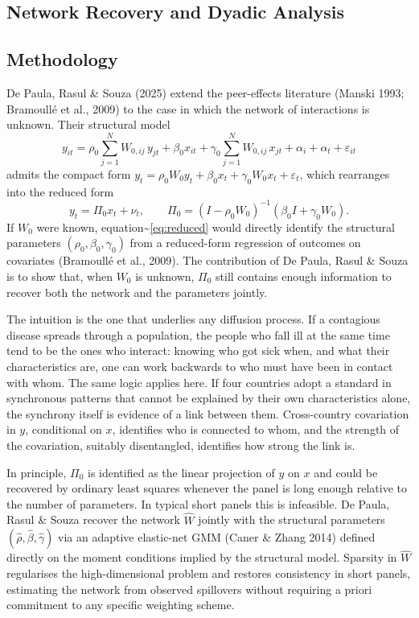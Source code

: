\documentclass[
  letterpaper,
  DIV=11,
  numbers=noendperiod]{scrartcl}
\begin{document}
\subsection{Network Recovery and Dyadic
Analysis}\label{network-recovery-and-dyadic-analysis}

\subsection*{Methodology}

De Paula, Rasul \& Souza (2025) extend the peer-effects literature
(Manski 1993; Bramoullé et al., 2009) to the case in which the network
of interactions is unknown. Their structural model \begin{equation}
y_{it} = \rho_0 \sum_{j=1}^{N} W_{0,ij}\, y_{jt} + \beta_0 x_{it} + \gamma_0 \sum_{j=1}^{N} W_{0,ij}\, x_{jt} + \alpha_i + \alpha_t + \varepsilon_{it}
\label{eq:structural}
\end{equation} admits the compact form
\(y_t = \rho_0 W_0 y_t + \beta_0 x_t + \gamma_0 W_0 x_t + \varepsilon_t\),
which rearranges into the reduced form \begin{equation}
y_t = \Pi_0 x_t + \nu_t, \qquad \Pi_0 = (I - \rho_0 W_0)^{-1}(\beta_0 I + \gamma_0 W_0).
\label{eq:reduced}
\end{equation} If \(W_0\) were known,
equation\textasciitilde{}\eqref{eq:reduced} would directly identify the
structural parameters \((\rho_0,\beta_0,\gamma_0)\) from a reduced-form
regression of outcomes on covariates (Bramoullé et al., 2009). The
contribution of De Paula, Rasul \& Souza is to show that, when \(W_0\)
is unknown, \(\Pi_0\) still contains enough information to recover both
the network and the parameters jointly.

The intuition is the one that underlies any diffusion process. If a
contagious disease spreads through a population, the people who fall ill
at the same time tend to be the ones who interact: knowing who got sick
when, and what their characteristics are, one can work backwards to who
must have been in contact with whom. The same logic applies here. If
four countries adopt a standard in synchronous patterns that cannot be
explained by their own characteristics alone, the synchrony itself is
evidence of a link between them. Cross-country covariation in \(y\),
conditional on \(x\), identifies who is connected to whom, and the
strength of the covariation, suitably disentangled, identifies how
strong the link is.

In principle, \(\Pi_0\) is identified as the linear projection of \(y\)
on \(x\) and could be recovered by ordinary least squares whenever the
panel is long enough relative to the number of parameters. In typical
short panels this is infeasible. De Paula, Rasul \& Souza recover the
network \(\hat W\) jointly with the structural parameters
\((\hat\rho, \hat\beta, \hat\gamma)\) via an adaptive elastic-net GMM
(Caner \& Zhang 2014) defined directly on the moment conditions implied
by the structural model. Sparsity in \(\hat W\) regularises the
high-dimensional problem and restores consistency in short panels,
estimating the network from observed spillovers without requiring a
priori commitment to any specific weighting scheme.
\end{document}

